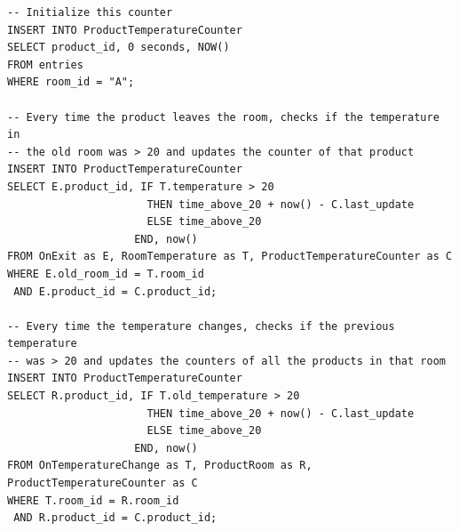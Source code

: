 \documentclass{report}
\begin{document}
\begin{verbatim}
-- Initialize this counter
INSERT INTO ProductTemperatureCounter
SELECT product_id, 0 seconds, NOW()
FROM entries
WHERE room_id = "A";

-- Every time the product leaves the room, checks if the temperature in
-- the old room was > 20 and updates the counter of that product
INSERT INTO ProductTemperatureCounter
SELECT E.product_id, IF T.temperature > 20
                      THEN time_above_20 + now() - C.last_update
                      ELSE time_above_20
                    END, now()
FROM OnExit as E, RoomTemperature as T, ProductTemperatureCounter as C
WHERE E.old_room_id = T.room_id
 AND E.product_id = C.product_id;

-- Every time the temperature changes, checks if the previous temperature
-- was > 20 and updates the counters of all the products in that room
INSERT INTO ProductTemperatureCounter
SELECT R.product_id, IF T.old_temperature > 20
                      THEN time_above_20 + now() - C.last_update
                      ELSE time_above_20
                    END, now()
FROM OnTemperatureChange as T, ProductRoom as R, ProductTemperatureCounter as C
WHERE T.room_id = R.room_id
 AND R.product_id = C.product_id;
\end{verbatim}
\end{document}
